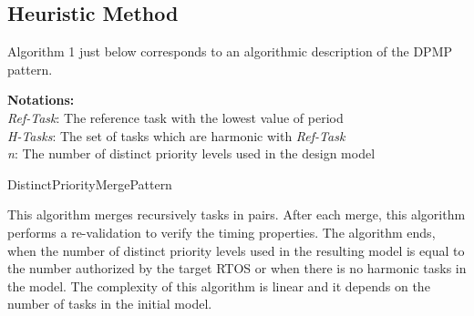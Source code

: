 \documentclass[runningheads,a4paper]{llncs}
\begin{document}
\subsection{Heuristic Method}
Algorithm 1 just below corresponds to an algorithmic description of the DPMP pattern.
\begin{algorithm}[h]
\DontPrintSemicolon
\begin {scriptsize}
\textbf{Notations:}\\
\textit {Ref-Task}: The reference task with the lowest value of period \\
\textit {H-Tasks}: The set of tasks which are harmonic with \textit{Ref-Task}\\
\textit {n}: The number of distinct priority levels used in the design model \\
\caption{DistinctPriorityMergePattern\label{pattern}}
\end{scriptsize}
\end{algorithm}
This algorithm merges recursively tasks in pairs. After each merge, this algorithm performs a re-validation to verify the timing properties. 
The algorithm ends, when the number of distinct priority levels used in the resulting model is equal to the number authorized by the target RTOS or when there is no harmonic tasks in the model. The complexity of this algorithm is linear and it depends on the number of tasks in the initial model. 
\end{document}
